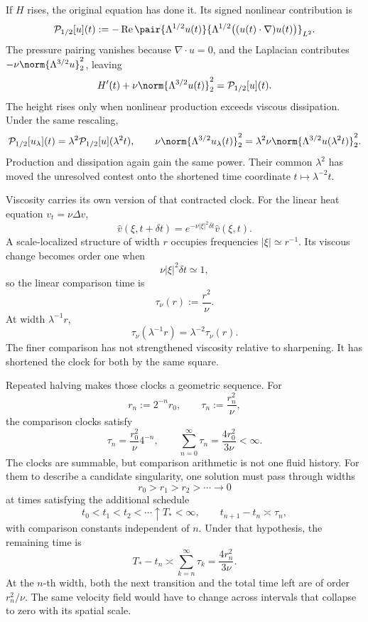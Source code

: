 
If \(H\) rises, the original equation has done it.
Its signed nonlinear contribution is
\[
  \mathcal P_{1/2}[u](t)
  :=
  -\operatorname{Re}
  \pair
    {\Lambda^{1/2}u(t)}
    {\Lambda^{1/2}\bigl((u(t)\cdot\nabla)u(t)\bigr)}_{L^2}.
\]
The pressure pairing vanishes because \(\nabla\cdot u=0\), and the Laplacian contributes \(-\nu\norm{\Lambda^{3/2}u}_2^2\), leaving
\[
  H'(t)
  +
  \nu\norm{\Lambda^{3/2}u(t)}_2^2
  =
  \mathcal P_{1/2}[u](t).
\]
The height rises only when nonlinear production exceeds viscous dissipation.
Under the same rescaling,
\[
  \mathcal P_{1/2}[u_\lambda](t)
  =
  \lambda^2\mathcal P_{1/2}[u](\lambda^2t),
  \qquad
  \nu\norm{\Lambda^{3/2}u_\lambda(t)}_2^2
  =
  \lambda^2\nu\norm{\Lambda^{3/2}u(\lambda^2t)}_2^2.
\]
Production and dissipation again gain the same power.
Their common \(\lambda^2\) has moved the unresolved contest onto the shortened time coordinate \(t\mapsto\lambda^{-2}t\).


Viscosity carries its own version of that contracted clock.
For the linear heat equation \(v_t=\nu\Delta v\),
\[
  \widehat v(\xi,t+\delta t)
  =
  e^{-\nu|\xi|^2\delta t}\widehat v(\xi,t).
\]
A scale-localized structure of width \(r\) occupies frequencies \(|\xi|\simeq r^{-1}\).
Its viscous change becomes order one when
\[
  \nu|\xi|^2\delta t\simeq1,
\]
so the linear comparison time is
\[
  \tau_\nu(r)
  :=
  \frac{r^2}{\nu}.
\]
At width \(\lambda^{-1}r\),
\[
  \tau_\nu(\lambda^{-1}r)
  =
  \lambda^{-2}\tau_\nu(r).
\]
The finer comparison has not strengthened viscosity relative to sharpening.
It has shortened the clock for both by the same square.


Repeated halving makes those clocks a geometric sequence.
For
\[
  r_n:=2^{-n}r_0,
  \qquad
  \tau_n:=\frac{r_n^2}{\nu},
\]
the comparison clocks satisfy
\[
  \tau_n
  =
  \frac{r_0^2}{\nu}4^{-n},
  \qquad
  \sum_{n=0}^{\infty}\tau_n
  =
  \frac{4r_0^2}{3\nu}
  <
  \infty.
\]
The clocks are summable, but comparison arithmetic is not one fluid history.
For them to describe a candidate singularity, one \NavierStokes{} solution must pass through widths
\[
  r_0>r_1>r_2>\cdots\longrightarrow0
\]
at times satisfying the additional schedule
\[
  t_0<t_1<t_2<\cdots\uparrow T_*<\infty,
  \qquad
  t_{n+1}-t_n\asymp\tau_n,
\]
with comparison constants independent of \(n\).
Under that hypothesis, the remaining time is
\[
  T_*-t_n
  \asymp
  \sum_{k=n}^{\infty}\tau_k
  =
  \frac{4r_n^2}{3\nu}.
\]
At the \(n\)-th width, both the next transition and the total time left are of order \(r_n^2/\nu\).
The same velocity field would have to change across intervals that collapse to zero with its spatial scale.
